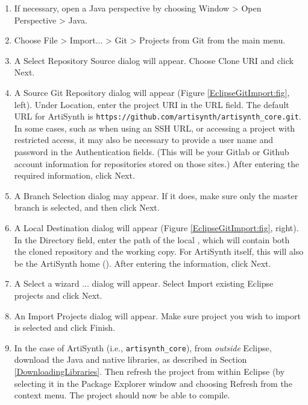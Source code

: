 \begin{enumerate}

\item If necessary, open a Java perspective by choosing {\sf Window >
Open Perspective > Java}.

\item Choose {\sf File > Import... > Git > Projects from Git}
from the main menu.

\item A {\sf Select Repository Source} dialog will appear. Choose
{\sf Clone URI} and click {\sf Next}.

\item A {\sf Source Git Repository} dialog will appear
(Figure \ref{EclipseGitImport:fig}, left).  Under {\sf Location},
enter the project URI in the {\sf URL} field.  The default URL for
ArtiSynth is {\tt https://github.com/artisynth/artisynth\_core.git}. In
some cases, such as when using an SSH URL, or accessing a project with
restricted access, it may also be necessary to provide a user name and
password in the {\sf Authentication} fields. (This will be your Gitlab
or Github account information for repositories stored on those sites.)
After entering the required information, click {\sf Next}.

\item A {\sf Branch Selection} dialog may appear. If it does,
make sure only the {\sf master} branch is selected, and then click {\sf Next}.

\item A {\sf Local Destination} dialog will appear (Figure
\ref{EclipseGitImport:fig}, right). In the {\sf Directory} field, enter
the path of the local \directory{}, which will contain both the cloned
repository and the working copy.  For ArtiSynth itself, this will also
be the ArtiSynth home \directory{} (\ArtHome[]).  After
entering the \directory{} information, click {\sf Next}.

\item A {\sf Select a wizard ...} dialog will appear.
Select {\sf Import existing Eclipse projects} and click {\sf Next}.

\item An {\sf Import Projects} dialog will appear.
Make sure project you wish to import is selected and click {\sf
Finish}.

\item In the case of ArtiSynth (i.e., {\tt artisynth\_core}), from {\it outside}
Eclipse, download the Java and native libraries, as described in
Section \ref{DownloadingLibraries}. Then refresh the project from
within Eclipse (by selecting it in the {\sf Package Explorer} window
and choosing {\sf Refresh} from the context menu. The project should
now be able to compile.

\end{enumerate}

